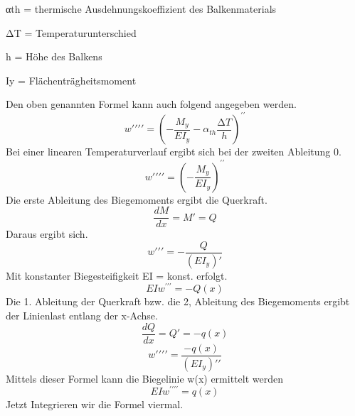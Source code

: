 αth = thermische Ausdehnungskoeffizient des Balkenmaterials

ΔT = Temperaturunterschied

h = Höhe des Balkens

Iy = Flächenträgheitsmoment

Den oben genannten Formel kann auch folgend angegeben werden.
\begin{equation}
	w\prime\prime\prime\prime=
	\left(-\frac{M_y}{EI_y}-\alpha_{th}\frac{∆T}{h}\right)^{\prime\prime}
\end{equation}
Bei einer linearen Temperaturverlauf ergibt sich bei der zweiten Ableitung 0.
\begin{equation}
	w\prime\prime\prime\prime=
	\left(-\frac{M_y}{EI_y}\right)^{\prime\prime}
\end{equation}
Die erste Ableitung des Biegemoments ergibt die Querkraft.
\begin{equation}
	\frac{dM}{dx}=
	M\prime=
	Q
\end{equation}
Daraus ergibt sich.
\begin{equation}
	w\prime\prime\prime=
	-\frac{Q}{(EI_y)\prime}
\end{equation}
Mit konstanter Biegesteifigkeit EI = konst. erfolgt.
\begin{equation}
	EIw^{\prime\prime\prime}=
	-Q\left(x\right)
\end{equation}
Die 1. Ableitung der Querkraft bzw. die 2, Ableitung des Biegemoments ergibt der Linienlast entlang der x-Achse.
\begin{equation}
	\frac{dQ}{dx}=
	Q\prime=
	-q(x)
\end{equation}
\begin{equation}
	w\prime\prime\prime\prime=
	\frac{-q(x)}{(EI_y)\prime\prime}
\end{equation}
Mittels dieser Formel kann die Biegelinie w(x) ermittelt werden
\begin{equation}
	EIw^{\prime\prime\prime\prime}=
	q\left(x\right) 
\end{equation}
Jetzt Integrieren wir die Formel viermal.

